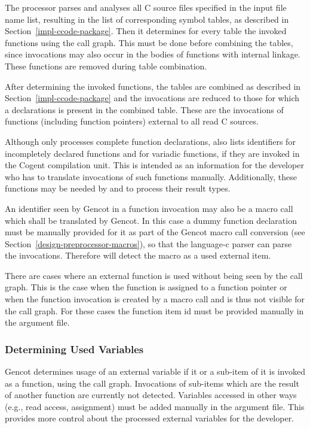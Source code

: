 The processor parses and analyses
all C source files specified in the input file name list, resulting in the list of corresponding symbol tables, as
described in Section~\ref{impl-ccode-package}. Then
it determines for every table the invoked functions using the call graph. This must
be done before combining the tables, since invocations may also occur in the bodies of functions with internal
linkage. These functions are removed during table combination.

After determining the invoked functions, the tables are combined as described in Section~\ref{impl-ccode-package}
and the invocations are reduced to those for
which a declarations is present in the combined table. These are the invocations of functions (including function pointers)
external to all read C sources. 

Although  only processes complete function declarations, 
 also lists identifiers for incompletely declared functions and for variadic functions,
if they are invoked in the Cogent compilation unit. This is intended as an 
information for the developer who has to translate invocations of such functions manually. Additionally, these functions
may be needed by  and  to process their result types.

An identifier seen by Gencot in a function invocation may also be a macro call which shall be translated by Gencot. 
In this case a dummy function declaration must be manually provided for it as part of the Gencot macro call conversion
(see Section~\ref{design-preprocessor-macros}), so that the language-c parser can parse the invocations. 
Therefore  will detect the macro as a used external item.

There are cases where an external function is used without being seen by the call graph. This is the case when
the function is assigned to a function pointer or when the function invocation is created by a macro call and
is thus not visible for the call graph. For these cases the function item id must be provided manually in the argument file.

\subsubsection{Determining Used Variables}

Gencot determines usage of an external variable if it or a sub-item of it is invoked as a function, using the 
call graph. Invocations of sub-items which are the result of another function are currently not detected. 
Variables accessed in other ways (e.g., read access, assignment) must be added manually in the argument file. This
provides more control about the processed external variables for the developer.

